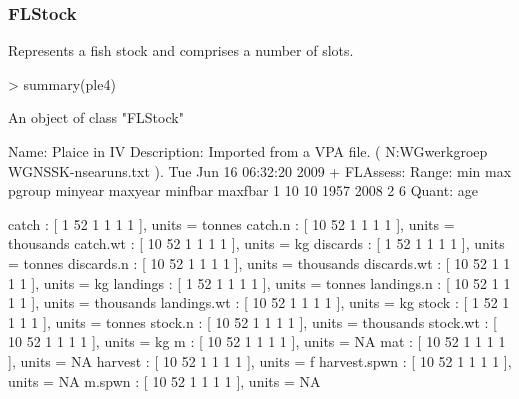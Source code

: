 \documentclass{beamer}%
\begin{document}

\begin{frame}[containsverbatim]
  \frametitle{FLStock}
Represents a fish stock and comprises a number of slots.
{\tiny{
\begin{Schunk}
\begin{Sinput}
> summary(ple4)
\end{Sinput}
\begin{Soutput}
An object of class "FLStock"

Name: Plaice in IV 
Description: Imported from a VPA file. ( N:\Projecten\ICES WG\Demersale werkgroep WGNSSK\stock\ple-nsea\final runs\index.txt ).  Tue Jun 16 06:32:20 2009 + FLAssess:  
Range:	 min	max	pgroup	minyear	maxyear	minfbar	maxfbar 
	1	10	10	1957	2008	2	6	
Quant: age 

catch         : [ 1 52 1 1 1 1 ], units =  tonnes 
catch.n       : [ 10 52 1 1 1 1 ], units =  thousands 
catch.wt      : [ 10 52 1 1 1 1 ], units =  kg 
discards      : [ 1 52 1 1 1 1 ], units =  tonnes 
discards.n    : [ 10 52 1 1 1 1 ], units =  thousands 
discards.wt   : [ 10 52 1 1 1 1 ], units =  kg 
landings      : [ 1 52 1 1 1 1 ], units =  tonnes 
landings.n    : [ 10 52 1 1 1 1 ], units =  thousands 
landings.wt   : [ 10 52 1 1 1 1 ], units =  kg 
stock         : [ 1 52 1 1 1 1 ], units =  tonnes 
stock.n       : [ 10 52 1 1 1 1 ], units =  thousands 
stock.wt      : [ 10 52 1 1 1 1 ], units =  kg 
m             : [ 10 52 1 1 1 1 ], units =  NA 
mat           : [ 10 52 1 1 1 1 ], units =  NA 
harvest       : [ 10 52 1 1 1 1 ], units =  f 
harvest.spwn  : [ 10 52 1 1 1 1 ], units =  NA 
m.spwn        : [ 10 52 1 1 1 1 ], units =  NA 
\end{Soutput}
\end{Schunk}
}}
\end{frame}
\end{document}
